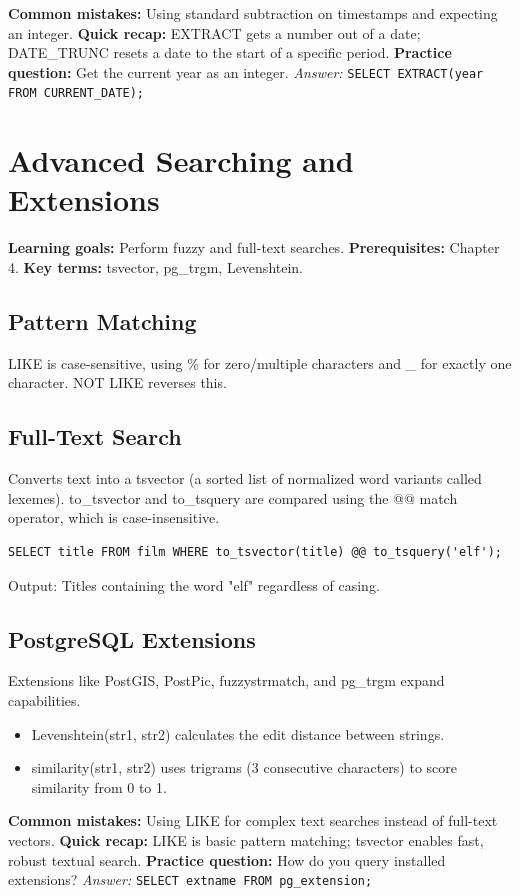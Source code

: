 \documentclass[12pt, a4paper]{article}
\begin{document}
\textbf{Common mistakes:} Using standard subtraction on timestamps and expecting an integer.
\textbf{Quick recap:} EXTRACT gets a number out of a date; DATE\_TRUNC resets a date to the start of a specific period.
\textbf{Practice question:} Get the current year as an integer.
\textit{Answer:} \texttt{SELECT EXTRACT(year FROM CURRENT\_DATE);}

\section{Advanced Searching and Extensions}
\textbf{Learning goals:} Perform fuzzy and full-text searches.
\textbf{Prerequisites:} Chapter 4.
\textbf{Key terms:} tsvector, pg\_trgm, Levenshtein.

\subsection{Pattern Matching}
LIKE is case-sensitive, using \% for zero/multiple characters and \_ for exactly one character. NOT LIKE reverses this.

\subsection{Full-Text Search}
Converts text into a tsvector (a sorted list of normalized word variants called lexemes). to\_tsvector and to\_tsquery are compared using the @@ match operator, which is case-insensitive.

\begin{verbatim}
SELECT title FROM film WHERE to_tsvector(title) @@ to_tsquery('elf');
\end{verbatim}
Output: Titles containing the word "elf" regardless of casing.

\subsection{PostgreSQL Extensions}
Extensions like PostGIS, PostPic, fuzzystrmatch, and pg\_trgm expand capabilities.
\begin{itemize}
    \item Levenshtein(str1, str2) calculates the edit distance between strings.
    \item similarity(str1, str2) uses trigrams (3 consecutive characters) to score similarity from 0 to 1.
\end{itemize}

\textbf{Common mistakes:} Using LIKE for complex text searches instead of full-text vectors.
\textbf{Quick recap:} LIKE is basic pattern matching; tsvector enables fast, robust textual search.
\textbf{Practice question:} How do you query installed extensions?
\textit{Answer:} \texttt{SELECT extname FROM pg\_extension;}
\end{document}
